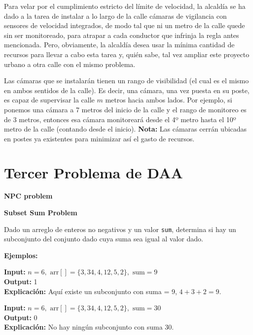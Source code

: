 \documentclass{article}
\begin{document}
Para velar por el cumplimiento estricto del límite de velocidad, la alcaldía se ha dado a la tarea de instalar a lo largo de la calle cámaras de vigilancia con sensores de velocidad integrados, de modo tal que ni un metro de la calle quede sin ser monitoreado, para atrapar a cada conductor que infrinja la regla antes mencionada. Pero, obviamente, la alcaldía desea usar la mínima cantidad de recursos para llevar a cabo esta tarea y, quién sabe, tal vez ampliar este proyecto urbano a otra calle con el mismo problema.

Las cámaras que se instalarán tienen un rango de visibilidad (el cual es el mismo en ambos sentidos de la calle). Es decir, una cámara, una vez puesta en su poste, es capaz de supervisar la calle \( m \) metros hacia ambos lados. Por ejemplo, si ponemos una cámara a 7 metros del inicio de la calle y el rango de monitoreo es de 3 metros, entonces esa cámara monitoreará desde el 4º metro hasta el 10º metro de la calle (contando desde el inicio).
\textbf{Nota:} Las cámaras cerrán ubicadas en postes ya existentes para minimizar así el gasto de recursos.

\section{Tercer Problema de DAA}
\textbf{NPC problem}
\begin{center}
    \LARGE \textbf{Subset Sum Problem} \\[0.5em] 
\end{center}

Dado un arreglo de enteros no negativos y un valor \texttt{sum}, determina si hay un subconjunto del conjunto dado cuya suma sea igual al valor dado.

\textbf{Ejemplos:}

\textbf{Input:} \( n = 6, \text{ arr}[] = \{3, 34, 4, 12, 5, 2\}, \text{ sum} = 9 \) \\
\textbf{Output:} 1 \\
\textbf{Explicación:} Aquí existe un subconjunto con suma = 9, \( 4 + 3 + 2 = 9 \).

\vspace{10pt}

\textbf{Input:} \( n = 6, \text{ arr}[] = \{3, 34, 4, 12, 5, 2\}, \text{ sum} = 30 \) \\
\textbf{Output:} 0 \\
\textbf{Explicación:} No hay ningún subconjunto con suma 30.
\end{document}

